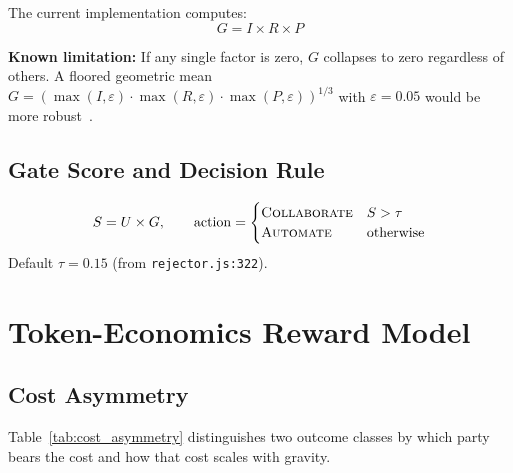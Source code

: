 \documentclass[conference]{IEEEtran}
\begin{document}
The current implementation computes:
\begin{equation}
  \label{eq:gravity}
  G = I \times R \times P
\end{equation}

\noindent\textbf{Known limitation:}
If any single factor is zero, $G$ collapses to zero regardless of others.
A floored geometric mean $G = (\max(I,\varepsilon) \cdot \max(R,\varepsilon)
\cdot \max(P,\varepsilon))^{1/3}$ with $\varepsilon{=}0.05$ would be more
robust~\cite{geifman2017selective}.

\subsection{Gate Score and Decision Rule}
\begin{equation}
  \label{eq:gate}
  S = U \times G, \qquad
  \mathrm{action} =
  \begin{cases}
    \textsc{Collaborate} & S > \tau \\
    \textsc{Automate}    & \text{otherwise}
  \end{cases}
\end{equation}
Default $\tau = 0.15$ (from \texttt{rejector.js:322}).

\section{Token-Economics Reward Model}\label{sec:reward}

\subsection{Cost Asymmetry}

Table~\ref{tab:cost_asymmetry} distinguishes two outcome classes by which
party bears the cost and how that cost scales with gravity.
\end{document}
